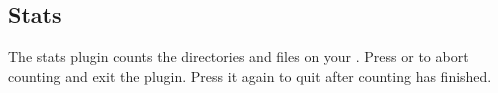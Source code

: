 \subsection{Stats}

The stats plugin counts the directories and files%
%
on your \dap{}.
Press \PluginCancel{} or \PluginExit{} to abort counting and
exit the plugin. Press it again to quit after counting has
finished.
